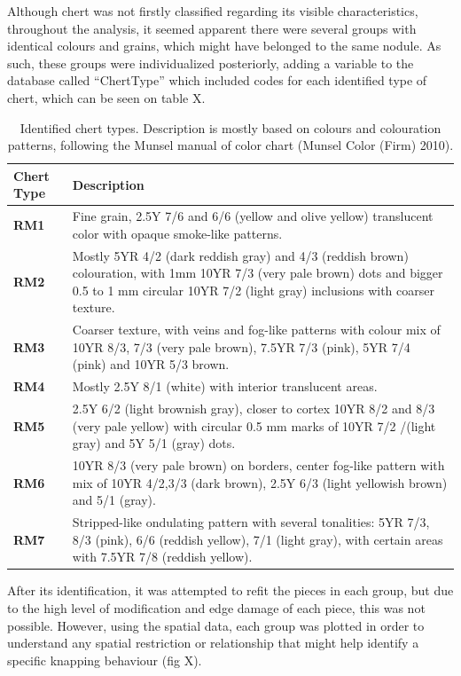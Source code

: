 \documentclass[12pt,twoside]{reedthesis}
\begin{document}
Although chert was not firstly classified regarding its visible characteristics, throughout the analysis, it seemed apparent there were several groups with identical colours and grains, which might have belonged to the same nodule. As such, these groups were individualized posteriorly, adding a variable to the database called ``ChertType'' which included codes for each identified type of chert, which can be seen on table X.
\begin{table}

\caption{\label{tab:cherttable}Identified chert types. Description is mostly based on colours and colouration patterns, following the Munsel manual of color chart (Munsel Color (Firm) 2010).}
\centering
\begin{tabular}[t]{>{\bfseries}l>{\raggedright\arraybackslash}p{10cm}}
\toprule
Chert Type & Description\\
\midrule
RM1 & Fine grain, 2.5Y 7/6 and 6/6 (yellow and olive yellow) translucent color with opaque smoke-like patterns.\\
RM2 & Mostly 5YR 4/2 (dark reddish gray) and 4/3 (reddish brown) colouration, with 1mm 10YR 7/3 (very pale brown) dots and bigger 0.5 to 1 mm circular 10YR 7/2 (light gray) inclusions with coarser texture.\\
RM3 & Coarser texture, with veins and fog-like patterns with colour mix of 10YR 8/3, 7/3 (very pale brown), 7.5YR 7/3 (pink), 5YR 7/4 (pink) and 10YR 5/3 brown.\\
RM4 & Mostly 2.5Y 8/1 (white) with interior translucent areas.\\
RM5 & 2.5Y 6/2 (light brownish gray), closer to cortex 10YR 8/2 and 8/3 (very pale yellow) with circular 0.5 mm marks of 10YR 7/2 /(light gray) and 5Y 5/1 (gray) dots.\\
\addlinespace
RM6 & 10YR 8/3 (very pale brown) on borders, center fog-like pattern with mix of 10YR 4/2,3/3 (dark brown), 2.5Y 6/3 (light yellowish brown) and 5/1 (gray).\\
RM7 & Stripped-like ondulating pattern with several tonalities: 5YR 7/3, 8/3 (pink), 6/6 (reddish yellow), 7/1 (light gray), with certain areas with 7.5YR 7/8 (reddish yellow).\\
\bottomrule
\end{tabular}
\end{table}
After its identification, it was attempted to refit the pieces in each group, but due to the high level of modification and edge damage of each piece, this was not possible. However, using the spatial data, each group was plotted in order to understand any spatial restriction or relationship that might help identify a specific knapping behaviour (fig X).
\end{document}
